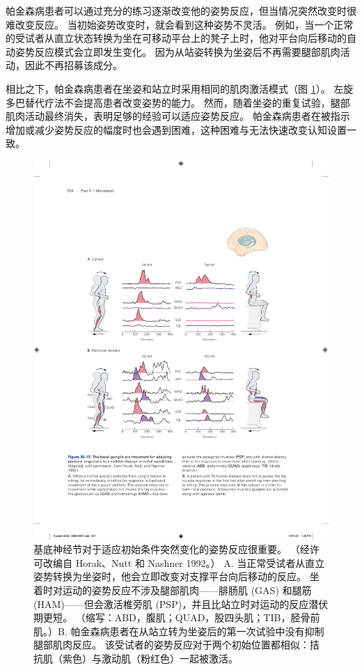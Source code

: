 帕金森病患者可以通过充分的练习逐渐改变他的姿势反应，但当情况突然改变时很难改变反应。 当初始姿势改变时，就会看到这种姿势不灵活。 例如，当一个正常的受试者从直立状态转换为坐在可移动平台上的凳子上时，他对平台向后移动的自动姿势反应模式会立即发生变化。 因为从站姿转换为坐姿后不再需要腿部肌肉活动，因此不再招募该成分。

相比之下，帕金森病患者在坐姿和站立时采用相同的肌肉激活模式（图 \ref{fig:36_15}）。 
左旋多巴替代疗法不会提高患者改变姿势的能力。 然而，随着坐姿的重复试验，腿部肌肉活动最终消失，表明足够的经验可以适应姿势反应。 帕金森病患者在被指示增加或减少姿势反应的幅度时也会遇到困难，这种困难与无法快速改变认知设置一致。

\begin{figure}[htbp]
	\centering
	\includegraphics[width=0.85\linewidth]{chap36/fig_36_15}
	\caption{基底神经节对于适应初始条件突然变化的姿势反应很重要。 （经许可改编自 Horak、Nutt 和 Nashner 1992。） A. 当正常受试者从直立姿势转换为坐姿时，他会立即改变对支撑平台向后移动的反应。 坐着时对运动的姿势反应不涉及腿部肌肉——腓肠肌 (GAS) 和腿筋 (HAM)——但会激活椎旁肌 (PSP)，并且比站立时对运动的反应潜伏期更短。 （缩写：ABD，腹肌；QUAD，股四头肌；TIB，胫骨前肌。）B. 帕金森病患者在从站立转为坐姿后的第一次试验中没有抑制腿部肌肉反应。 该受试者的姿势反应对于两个初始位置都相似：拮抗肌（紫色）与激动肌（粉红色）一起被激活。}
	\label{fig:36_15}
\end{figure}

